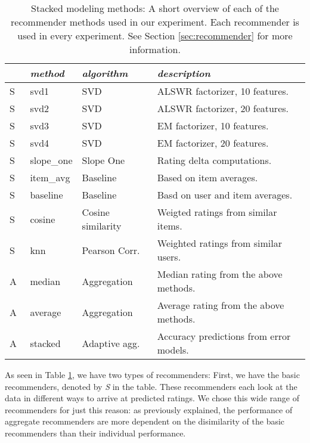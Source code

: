 \begin{table}[t]
  \begin{tabular*}{\textwidth}{ l l l l }
    \toprule
    ~ & \emph{method} &  \emph{algorithm} & \emph{description} \\
    \midrule
    S & svd1          & SVD                   & ALSWR factorizer, 10 features. \\
    S & svd2          & SVD                   & ALSWR factorizer, 20 features. \\
    S & svd3          & SVD                   & EM factorizer, 10 features. \\
    S & svd4          & SVD                   & EM factorizer, 20 features. \\
    S & slope\_one    & Slope One             & Rating delta computations. \\
    S & item\_avg     & Baseline              & Based on item averages. \\ 
    S & baseline      & Baseline              & Basd on user and item averages.\\ 
    S & cosine   	    & Cosine similarity     & Weigted ratings from similar items.\\ 
    S & knn       	  & Pearson Corr.         & Weighted ratings from similar users.\\
    \midrule
    A & median    	  & Aggregation           & Median rating from the above methods. \\
    A & average    	  & Aggregation           & Average rating from the above methods. \\
    A & stacked       & Adaptive agg.         & Accuracy predictions from error models. \\
    \bottomrule
  \end{tabular*}
  \caption[Stacked Modeling Methods]{
    Stacked modeling methods: A short overview of each of the recommender methods
    used in our experiment.
    Each recommender is used in every experiment. 
    See Section \ref{sec:recommender} for more information.
  }
  \label{table:results:methods}
\end{table}

As seen in Table \ref{table:results:methods}, we have two types of recommenders:
First, we have the basic recommenders, denoted by \emph{S} in the table.
These recommenders each look at the data in different ways to arrive at predicted ratings.
We chose this wide range of recommenders for just this reason:
as previously explained, the performance of aggregate recommenders
are more dependent on the disimilarity of the basic recommenders
than their individual performance.

